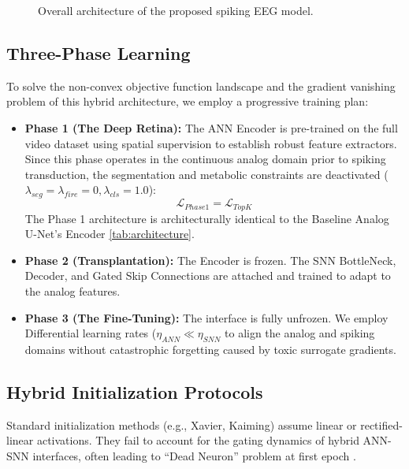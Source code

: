 \documentclass[conference]{IEEEtran}
\begin{document}
\begin{figure}[t]
  \centering
  
  \caption{Overall architecture of the proposed spiking EEG model.}
  \label{fig:architecture}
\end{figure}



\subsection{Three-Phase Learning}



To solve the non-convex objective function landscape and the gradient vanishing problem of this hybrid architecture, we employ a progressive training plan:
\begin{itemize}
    \item \textbf{Phase 1 (The Deep Retina):} The ANN Encoder is pre-trained on the full video dataset using spatial supervision to establish robust feature extractors. Since this phase operates in the continuous analog domain prior to spiking transduction, the segmentation and metabolic constraints are deactivated ($\lambda_{seg} = \lambda_{fire} = 0, \lambda_{cls} = 1.0$):
    \begin{equation}
        \mathcal{L}_{Phase1} = \mathcal{L}_{TopK}
    \end{equation}
    The Phase 1 architecture is architecturally identical to the Baseline Analog U-Net's Encoder \ref{tab:architecture}.

    
    
    \item \textbf{Phase 2 (Transplantation):} The Encoder is frozen. The SNN BottleNeck, Decoder, and Gated Skip Connections are attached and trained to adapt to the analog features.
    
    \item \textbf{Phase 3 (The Fine-Tuning):} The interface is fully unfrozen. We employ Differential learning rates ($\eta_{ANN} \ll \eta_{SNN}$ to align the analog and spiking domains without catastrophic forgetting caused by toxic surrogate gradients.
\end{itemize}



\subsection{Hybrid Initialization Protocols}
Standard initialization methods (e.g., Xavier, Kaiming) assume linear or rectified-linear activations. They fail to account for the gating dynamics of hybrid ANN-SNN interfaces, often leading to ``Dead Neuron'' problem at first epoch \cite{Micheli2025}.
\end{document}
